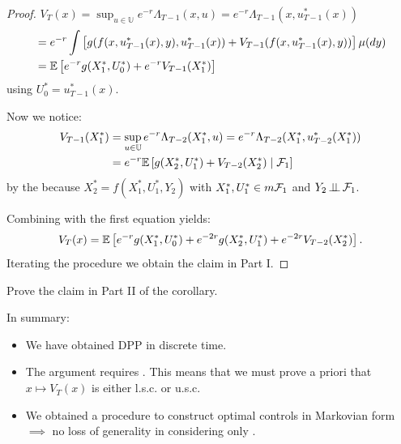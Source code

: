 \begin{proof}
    $V_T(x) = \sup_{u \in \mathbb{U}} e^{-r} \Lambda_{T-1}(x,u) = e^{-r} \Lambda_{T-1}(x, u_{T-1}^*(x))$
    \begin{align*}
        &= e^{-r} \int \left[ g(f(x, u_{T-1}^*(x), y), u_{T-1}^*(x)) + V_{T-1}(f(x, u_{T-1}^*(x), y)) \right] \mu(dy) \\
        &= \mathbb E \left[ e^{-r} g(X_1^*, U_0^*) + e^{-r} V_{T-1}(X_1^*) \right]
    \end{align*}
    using $U_0^* = u_{T-1}^*(x)$.
    
    Now we notice:
    \begin{align*}
        V_{T-1}(X_1^*) &= \sup_{u \in \mathbb{U}} e^{-r} \Lambda_{T-2}(X_1^*, u) = e^{-r} \Lambda_{T-2}(X_1^*, u_{T-2}^*(X_1^*)) \\
        &= e^{-r} \mathbb E \left[ g(X_2^*, U_1^*) + V_{T-2}(X_2^*) \mid \mathcal{F}_1 \right]
    \end{align*}
    by the  because $X_2^* = f(X_1^*, U_1^*, Y_2)$ with $X_1^*, U_1^* \in m\mathcal{F}_1$ and $Y_2 \operatorname{\perp\!\!\!\perp} \mathcal{F}_1$.
    
    Combining with the first equation yields:
    \[ V_T(x) = \mathbb E \left[ e^{-r} g(X_1^*, U_0^*) + e^{-2r} g(X_2^*, U_1^*) + e^{-2r} V_{T-2}(X_2^*) \right]. \]
    Iterating the procedure we obtain the claim in Part I.
\end{proof}

\begin{homework}
    Prove the claim in Part II of the corollary.
\end{homework}

\begin{remark}

    In summary:
    
    \begin{itemize}
        \item We have obtained DPP in discrete time.
        \item The argument requires . This means that we must prove a priori that $x \mapsto V_T(x)$ is either l.s.c. or u.s.c.
        \item We obtained a procedure to construct optimal controls in Markovian form $\implies$ no loss of generality in considering only .
    \end{itemize}

\end{remark}